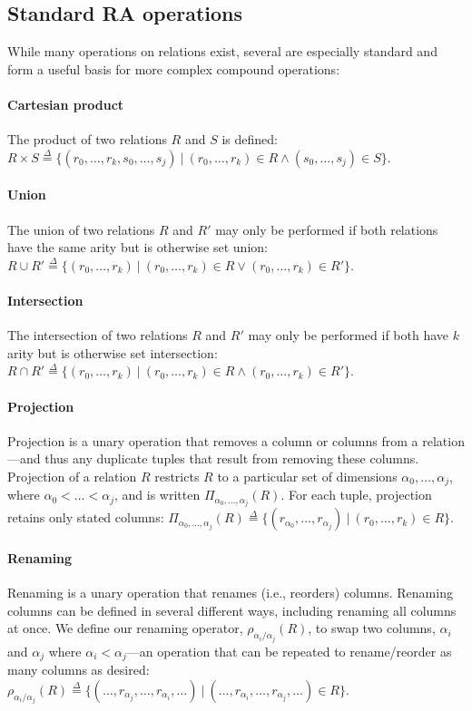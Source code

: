 \subsection{Standard RA operations}
\label{sec:ra:tc}
%
While many operations on relations exist, several are especially standard and form a useful basis for more complex compound operations:

\paragraph{Cartesian product} The product of two relations $R$ and $S$ is defined: $R \times S \overset{\Delta}{=} \{ (r_0, \ldots, r_k, s_0, \ldots, s_j) \ |\ (r_0, \ldots, r_k) \in R \wedge (s_0, \ldots, s_j) \in S \}$.


\paragraph{Union} The union of two relations $R$ and $R'$ may only be performed if both relations have the same arity but is otherwise set union: $R \cup R' \overset{\Delta}{=} \{ (r_0, \ldots, r_k) \ |\ (r_0, \ldots, r_k) \in R \vee (r_0, \ldots, r_k) \in R' \}$.


\paragraph{Intersection} The intersection of two relations $R$ and $R'$ may only be performed if both have $k$ arity but is otherwise set intersection: $R \cap R' \overset{\Delta}{=} \{ (r_0, \ldots, r_k) \ |\ (r_0, \ldots, r_k) \in R \wedge (r_0, \ldots, r_k) \in R' \}$.


\paragraph{Projection} Projection is a unary operation that removes a column or columns from a relation---and thus any duplicate tuples that result from removing these columns. Projection of a relation $R$ restricts $R$ to a particular set of dimensions ${\alpha_0, \ldots, \alpha_j}$, where $\alpha_0 < \ldots < \alpha_j$, and is written $\Pi_{\alpha_0,\ldots,\alpha_j}(R)$. For each tuple, projection retains only stated columns: $\Pi_{\alpha_0,\ldots,\alpha_j}(R) \overset{\Delta}{=} \{ (r_{\alpha_0}, \ldots, r_{\alpha_j}) \ |\  (r_0, \ldots, r_k) \in R \}$.


\paragraph{Renaming} Renaming is a unary operation that renames (i.e., reorders) columns. Renaming columns can be defined in several different ways, including renaming all columns at once. We define our renaming operator, $\rho_{\alpha_i / \alpha_j}(R)$, to swap two columns, $\alpha_i$ and $\alpha_j$ where $\alpha_i < \alpha_j$---an operation that can be repeated to rename/reorder as many columns as desired: \newline$\rho_{\alpha_i / \alpha_j}(R) \overset{\Delta}{=} \{ (\ldots,r_{\alpha_j},\ldots,r_{\alpha_{i}},\ldots) \ |\ (\ldots,r_{\alpha_{i}},\ldots,r_{\alpha_{j}},\ldots) \in R \}$.


